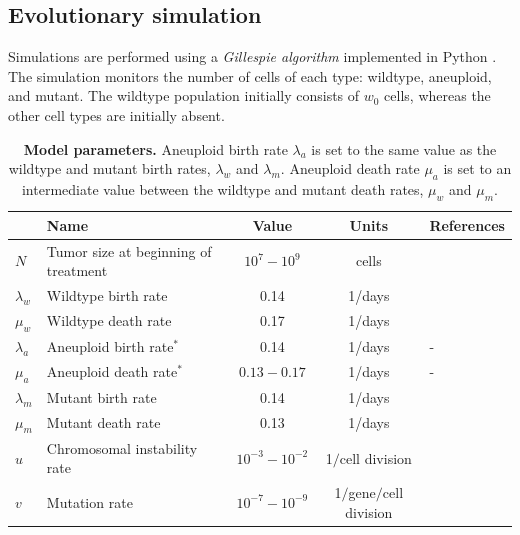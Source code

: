\documentclass[12pt]{extarticle}
\begin{document}
\subsection*{Evolutionary simulation} 
Simulations are performed using a \emph{Gillespie algorithm} \citep{gillespie1976general,gillespie1977exact} implemented in Python \citep{python}.
The simulation monitors the number of cells of each type: wildtype, aneuploid, and mutant. 
The wildtype population initially consists of $w_0$ cells, whereas the other cell types are initially absent.

\begin{table}
\begin{center}
  \begin{tabular}{| l |p{5cm}| c | c | p{3cm} |}
    \hline
     & Name & Value & Units & References \\ \hline
    $N$ & Tumor size at beginning of treatment& $10^7-10^9$ & cells  & \citet{del2009does} \\ \hline
    $\lambda_w$ & Wildtype birth rate& 0.14 & 1/days  & \citep{bozic2013evolutionary} \\ \hline
    $\mu_w$ & Wildtype death rate& 0.17 & 1/days  & \citet{bozic2013evolutionary} \\ \hline
    $\lambda_a$  & Aneuploid birth rate$^\ast$ & 0.14 & 1/days  & - \\ \hline
    $\mu_a$ & Aneuploid death rate$^\ast$ & $0.13-0.17$ & 1/days  & - \\ \hline
    $\lambda_m$ & Mutant birth rate& 0.14 & 1/days  & \citet{bozic2013evolutionary} \\ \hline
    $\mu_m$ & Mutant death rate& 0.13 & 1/days  & \citet{bozic2013evolutionary} \\ \hline
    $u$ & Chromosomal instability rate& $10^{-3}-10^{-2}$ & 1$\slash$cell division  & \citet{nowak2004evolutionary,bakker2023predicting} \\ \hline
    $v$ & Mutation rate& $10^{-7}-10^{-9}$ &  1$\slash$gene$\slash$cell division  & \citet{nowak2004evolutionary} \\ \hline
  \end{tabular}
\caption{\textbf{Model parameters.} 
Aneuploid birth rate $\lambda_a$ is set to the same value as the wildtype and mutant birth rates, $\lambda_w$ and $\lambda_m$.
Aneuploid death rate $\mu_a$ is set to an intermediate value between the wildtype and mutant death rates, $\mu_w$ and $\mu_m$.}
  \label{table1}
\end{center}
\end{table}
\end{document}
